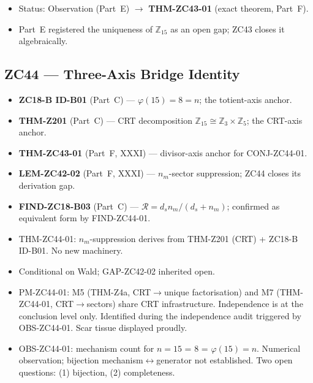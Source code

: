 \documentclass[12pt, a4paper]{article}
\begin{document}
\begin{correctionbox}
\begin{itemize}[leftmargin=*, noitemsep]
\item {}
  Status: Observation (Part~E) $\to$
  \textbf{THM-ZC43-01} (exact theorem, Part~F).
\item {}
  Part~E registered the uniqueness of $\mathbb{Z}_{15}$
  as an open gap; ZC43 closes it algebraically.
\end{itemize}
\end{correctionbox}

\subsection{ZC44 --- Three-Axis Bridge Identity}

\begin{inheritbox}
\begin{itemize}[leftmargin=*, noitemsep]
\item \textbf{ZC18-B ID-B01} (Part~C) ---
  $\varphi(15) = 8 = n$; the totient-axis anchor.
\item \textbf{THM-Z201} (Part~C) ---
  CRT decomposition $\mathbb{Z}_{15} \cong \mathbb{Z}_3
  \times \mathbb{Z}_5$; the CRT-axis anchor.
\item \textbf{THM-ZC43-01} (Part~F, XXXI) ---
  divisor-axis anchor for CONJ-ZC44-01.
\item \textbf{LEM-ZC42-02} (Part~F, XXXI) ---
  $n_m$-sector suppression; ZC44 closes its derivation gap.
\item \textbf{FIND-ZC18-B03} (Part~C) ---
  $\mathcal{R} = d_s n_m/(d_s+n_m)$; confirmed as
  equivalent form by FIND-ZC44-01.
\end{itemize}
\end{inheritbox}

\begin{correctionbox}
\begin{itemize}[leftmargin=*, noitemsep]
\item {}
  THM-ZC44-01: $n_m$-suppression derives from THM-Z201
  (CRT) + ZC18-B ID-B01. No new machinery.
\item {}
  Conditional on Wald; GAP-ZC42-02 inherited open.
\item {}
  PM-ZC44-01: M5 (THM-Z4a, CRT$\to$unique factorisation)
  and M7 (THM-ZC44-01, CRT$\to$sectors) share CRT
  infrastructure. Independence is at the conclusion level
  only. Identified during the independence audit triggered
  by OBS-ZC44-01. Scar tissue displayed proudly.
\item {}
  OBS-ZC44-01: mechanism count for $n=15$ = 8 =
  $\varphi(15) = n$. Numerical observation; bijection
  mechanism$\leftrightarrow$generator not established.
  Two open questions: (1) bijection, (2) completeness.
\end{itemize}
\end{correctionbox}
\end{document}
